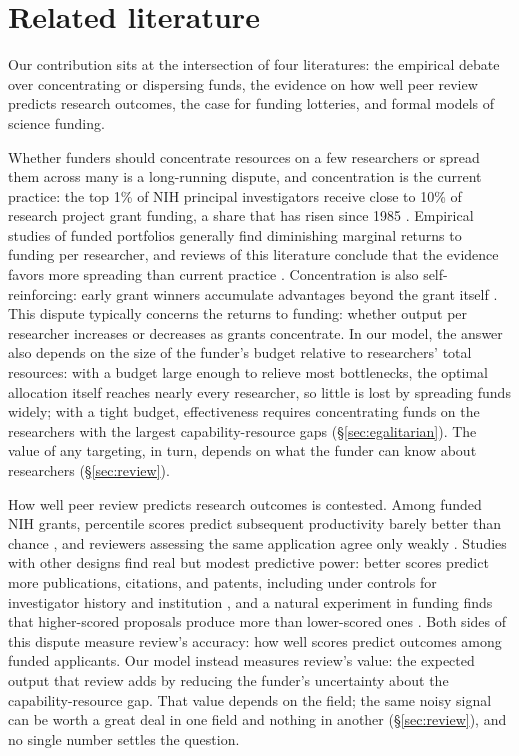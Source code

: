 \documentclass[article, 11pt, reqno]{amsart}
\theoremstyle{named}
\begin{document}
\section{Related literature}\label{sec:literature}

Our contribution sits at the intersection of four literatures: the empirical debate over concentrating or dispersing funds, the evidence on how well peer review predicts research outcomes, the case for funding lotteries, and formal models of science funding.

Whether funders should concentrate resources on a few researchers or spread them across many is a long-running dispute, and concentration is the current practice: the top 1\% of NIH principal investigators receive close to 10\% of research project grant funding, a share that has risen since 1985 \citep{KatzMatter2020, Lauer2021}. Empirical studies of funded portfolios generally find diminishing marginal returns to funding per researcher, and reviews of this literature conclude that the evidence favors more spreading than current practice \citep{Mongeon2016, Aagaard2020}. Concentration is also self-reinforcing: early grant winners accumulate advantages beyond the grant itself \citep{BolVaanRijt2018}. This dispute typically concerns the returns to funding: whether output per researcher increases or decreases as grants concentrate. In our model, the answer also depends on the size of the funder's budget relative to researchers' total resources: with a budget large enough to relieve most bottlenecks, the optimal allocation itself reaches nearly every researcher, so little is lost by spreading funds widely; with a tight budget, effectiveness requires concentrating funds on the researchers with the largest capability-resource gaps (\S\ref{sec:egalitarian}). The value of any targeting, in turn, depends on what the funder can know about researchers (\S\ref{sec:review}).

How well peer review predicts research outcomes is contested. Among funded NIH grants, percentile scores predict subsequent productivity barely better than chance \citep{Fang2016}, and reviewers assessing the same application agree only weakly \citep{Pier2018}. Studies with other designs find real but modest predictive power: better scores predict more publications, citations, and patents, including under controls for investigator history and institution \citep{LiAgha2015}, and a natural experiment in funding finds that higher-scored proposals produce more than lower-scored ones \citep{ParkLeeKim2015}. Both sides of this dispute measure review's accuracy: how well scores predict outcomes among funded applicants. Our model instead measures review's value: the expected output that review adds by reducing the funder's uncertainty about the capability-resource gap. That value depends on the field; the same noisy signal can be worth a great deal in one field and nothing in another (\S\ref{sec:review}), and no single number settles the question.
\end{document}
